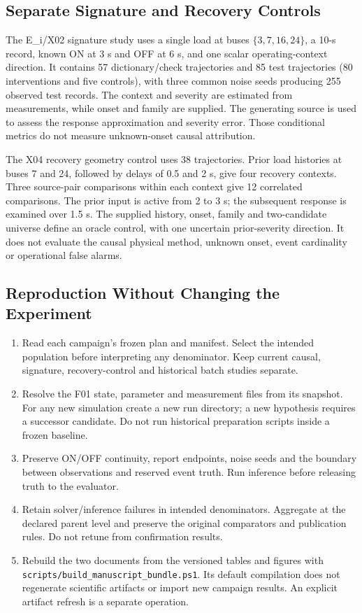 \subsection{Separate Signature and Recovery Controls}

The E\_i/X02 signature study uses a single load at buses
$\{3,7,16,24\}$, a 10-s record, known ON at 3 s and OFF at 6 s,
and one scalar operating-context direction. It contains 57 dictionary/check
trajectories and 85 test trajectories (80 interventions and five controls),
with three common noise seeds producing 255 observed test records.
The context and severity are estimated from measurements, while onset
and family are supplied. The generating source is used to assess the
response approximation and severity error. Those conditional metrics do
not measure unknown-onset causal attribution.

The X04 recovery geometry control uses 38 trajectories. Prior load
histories at buses 7 and 24, followed by delays of 0.5 and 2 s,
give four recovery contexts. Three source-pair comparisons within each
context give 12 correlated comparisons. The prior input is active from
2 to 3 s; the subsequent response is examined over 1.5 s. The supplied
history, onset, family and two-candidate universe define an oracle control,
with one uncertain prior-severity direction. It does not evaluate the causal physical method,
unknown onset, event cardinality or operational false alarms.

\subsection{Reproduction Without Changing the Experiment}

\begin{enumerate}
\item Read each campaign's frozen plan and manifest. Select the intended
population before interpreting any denominator. Keep current causal,
signature, recovery-control and historical batch studies separate.
\item Resolve the F01 state, parameter and measurement files from its
snapshot. For any new simulation create a new run directory; a new
hypothesis requires a successor candidate. Do not run historical preparation
scripts inside a frozen baseline.
\item Preserve ON/OFF continuity, report endpoints, noise seeds and the
boundary between observations and reserved event truth. Run inference
before releasing truth to the evaluator.
\item Retain solver/inference failures in intended denominators. Aggregate
at the declared parent level and preserve the original comparators and
publication rules. Do not retune from confirmation results.
\item Rebuild the two documents from the versioned tables and figures with
\nolinkurl{scripts/build_manuscript_bundle.ps1}. Its default compilation
does not regenerate scientific artifacts or import new campaign results.
An explicit artifact refresh is a separate operation.
\end{enumerate}

